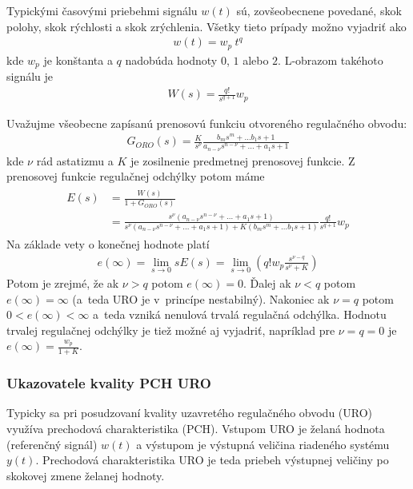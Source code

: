 \documentclass[a4paper, 10pt, ]{article}
\begin{document}
Typickými časovými priebehmi signálu $w(t)$ sú, zovšeobecnene povedané, skok polohy, skok rýchlosti a skok zrýchlenia. Všetky tieto prípady možno vyjadriť ako
\begin{align}
    w(t) = w_p \ t^q
\end{align}
kde $w_p$ je konštanta a $q$ nadobúda hodnoty $0$, $1$ alebo $2$. L-obrazom takéhoto signálu je
\begin{align}
    W(s) = \frac{q!}{s^{q+1}}w_p
\end{align}


Uvažujme všeobecne zapísanú prenosovú funkciu otvoreného regulačného obvodu:
\begin{align}
    G_{ORO}(s) = \frac{K}{s^\nu} \frac{b_m s^m + \ldots b_1 s + 1}{a_{n-\nu}s^{n-\nu} + \ldots + a_1s + 1}
\end{align}
kde $\nu$ rád astatizmu a $K$ je zosilnenie predmetnej prenosovej funkcie. Z prenosovej funkcie  regulačnej odchýlky potom máme
\begin{align}
\begin{aligned}
    E(s) &= \frac{W(s)}{1 + G_{ORO}(s)}
    \\&= \frac{s^\nu \left( a_{n-\nu}s^{n-\nu} + \ldots + a_1s + 1 \right)}{s^\nu \left( a_{n-\nu}s^{n-\nu} + \ldots + a_1s + 1 \right) + K \left( b_m s^m + \ldots b_1 s + 1 \right)}
    \frac{q!}{s^{q+1}}w_p
\end{aligned}
\end{align}
Na základe vety o konečnej hodnote platí
\begin{align}
    e(\infty) = \lim_{s\to 0} s E(s) =  \lim_{s\to 0} \left( q! w_p \frac{s^{\nu-q}}{s^\nu + K} \right)
\end{align}
Potom je zrejmé, že ak $\nu > q$ potom $e(\infty) = 0$. Ďalej ak $\nu < q$ potom $e(\infty) = \infty$ (a~teda URO je v~princípe nestabilný). Nakoniec ak $\nu = q$ potom $ 0 < e(\infty) < \infty$ a~teda vzniká nenulová trvalá regulačná odchýlka. Hodnotu trvalej regulačnej odchýlky je tiež možné aj vyjadriť, napríklad pre $\nu = q = 0$ je $e(\infty) = \frac{w_p}{1 + K}$.









\subsubsection{Ukazovatele kvality PCH URO}

Typicky sa pri posudzovaní kvality uzavretého regulačného obvodu (URO) využíva prechodová charakteristika (PCH). Vstupom URO je želaná hodnota (referenčný signál) $w(t)$ a výstupom je výstupná veličina riadeného systému $y(t)$. Prechodová charakteristika URO je teda priebeh výstupnej veličiny po skokovej zmene želanej hodnoty.
\end{document}
